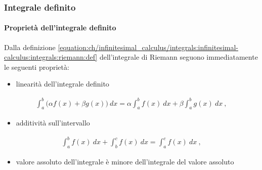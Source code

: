 \documentclass[letterpaper,10pt,italian]{jupyterBook}
\begin{document}
\subsubsection{Integrale definito}
\label{\detokenize{ch/infinitesimal_calculus/integrals:integrale-definito}}\label{\detokenize{ch/infinitesimal_calculus/integrals:infinitesimal-calculus-integrals-def-definite}}

\paragraph{Proprietà dell’integrale definito}
\label{\detokenize{ch/infinitesimal_calculus/integrals:proprieta-dell-integrale-definito}}\label{\detokenize{ch/infinitesimal_calculus/integrals:infinitesimal-calculus-integrals-def-definite-prop}}\label{\detokenize{ch/infinitesimal_calculus/integrals:infinitesimal-calculus-integrals-def-indefinite}}
\sphinxAtStartPar
Dalla definizione \eqref{equation:ch/infinitesimal_calculus/integrals:infinitesimal-calculus:integrals:riemann:def} dell’integrale di Riemann seguono immediatamente le seguenti proprietà:
\begin{itemize}
\item {} 
\sphinxAtStartPar
linearità dell’integrale definito

\end{itemize}
\begin{equation}\label{equation:ch/infinitesimal_calculus/integrals:infinitesimal-calculus:integrals:prop:linearity}
\begin{split}\int_a^b \big( \alpha f(x) + \beta g(x) \big) \ dx = \alpha \int_a^b f(x) \ dx + \beta \int_a^b g(x) \ dx \ ,\end{split}
\end{equation}\begin{itemize}
\item {} 
\sphinxAtStartPar
additività sull’intervallo

\end{itemize}
\begin{equation}\label{equation:ch/infinitesimal_calculus/integrals:infinitesimal-calculus:integrals:prop:add}
\begin{split}\int_a^b f(x) \ dx + \int_b^c f(x) \ dx = \int_a^c f(x) \ dx \ ,\end{split}
\end{equation}\begin{itemize}
\item {} 
\sphinxAtStartPar
valore assoluto dell’integrale è minore dell’integrale del valore assoluto

\end{itemize}
\end{document}
